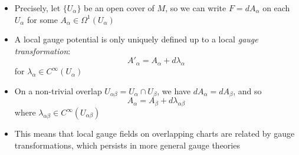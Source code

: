 \documentclass[12pt,a4paper]{article}
\numberwithin{equation}{section}
\begin{document}
\begin{itemize}
		\item Precisely, let $\{U_{\alpha}\}$ be an open cover of $M$, so we can write $F=dA_{\alpha}$ on each $U_{\alpha}$ for some $A_{\alpha}\in\Omega^{1}(U_{\alpha})$
		\item A local gauge potential is only uniquely defined up to a local \textit{gauge transformation}:
		\begin{equation}
			A'_{\alpha}=A_{\alpha}+d\lambda_{\alpha}
		\end{equation}
		for $\lambda_{\alpha}\in C^{\infty}(U_{\alpha})$
		\item On a non-trivial overlap $U_{\alpha\beta}=U_{\alpha}\cap U_{\beta}$, we have $dA_{\alpha}=dA_{\beta}$, and so
		\begin{equation}
			A_{\alpha}=A_{\beta}+d\lambda_{\alpha\beta}
		\end{equation}
		where $\lambda_{\alpha\beta}\in C^{\infty}(U_{\alpha\beta})$
		\item This means that local gauge fields on overlapping charts are related by gauge transformations, which persists in more general gauge theories
	\end{itemize}
\end{document}
